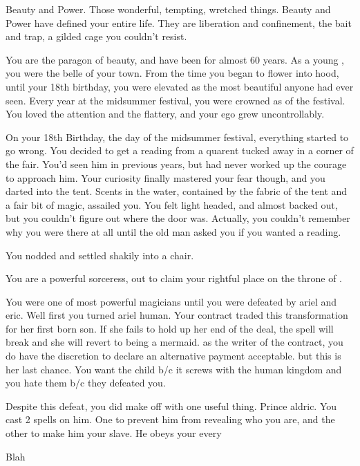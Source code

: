 \documentclass[char]{NeptuneBall}
\begin{document}
\name{\cWitch{}}



Beauty and Power. Those wonderful, tempting, wretched things. Beauty and Power have defined your entire life. They are liberation and confinement, the bait and trap, a gilded cage you couldn't resist.

You are the paragon of beauty, and have been for almost 60 years. As a young \cWtich{\mer}, you were the belle of your town. From the time you began to flower into \cWitch{\human}hood, until your 18th birthday, you were elevated as the most beautiful \cWitch{\mer} anyone had ever seen. Every year at the midsummer festival, you were crowned as \cWitch{\King} of the festival. You loved the attention and the flattery, and your ego grew uncontrollably.

On your 18th Birthday, the day of the midsummer festival, everything started to go wrong. You decided to get a reading from a quarent tucked away in a corner of the fair. You'd seen him in previous years, but had never worked up the courage to approach him. Your curiosity finally mastered your fear though, and you darted into the tent. Scents in the water, contained by the fabric of the tent and a fair bit of magic, assailed you. You felt light headed, and almost backed out, but you couldn't figure out where the door was. Actually, you couldn't remember why you were there at all until the old man asked you if you wanted a reading.

You nodded and settled shakily into a chair.

You are a powerful sorceress, out to claim your rightful place on the throne of \pAtlantis{}. 

You were one of \pAtlantis{} most powerful magicians until you were defeated by ariel and eric.  Well first you turned ariel human. Your contract traded this transformation for her first born son. If she fails to hold up her end of the deal, the spell will break and she will revert to being a mermaid. as the writer of the contract, you do have the discretion to declare an alternative payment acceptable. but this is her last chance. You want the child b/c it screws with the human kingdom and you hate them b/c they defeated you.

Despite this defeat, you did make off with one useful thing. Prince aldric. You cast 2 spells on him. One to prevent him from revealing who you are, and the other to make him your slave. He obeys your every


\begin{itemz}[Goals]
  \item Blah
\end{itemz}

\begin{contacts}
  \contact{}
\end{contacts}
\end{document}
